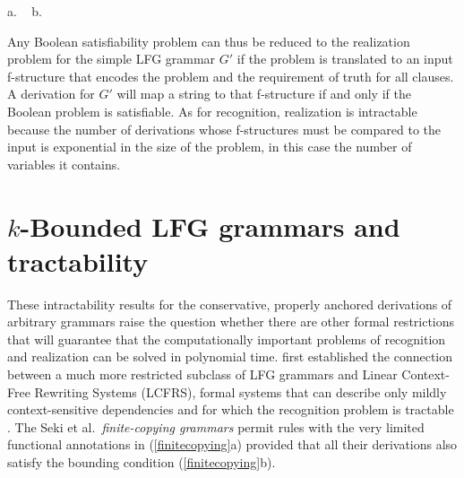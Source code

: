 \documentclass[output=paper,hidelinks]{langscibook}
\begin{document}
\ea\label{badfs}
\!\!\!a. \  
\hsp{1.5em}
b. \          
\z

 Any Boolean satisfiability problem can thus be reduced to the realization problem for the simple LFG grammar $G'$ if the problem is translated to an input f-structure that encodes the problem and the requirement of truth for all clauses.  A derivation for $G'$ will map a string to that f-structure if and only if the Boolean problem is satisfiable.  As for recognition, realization is intractable because the number of derivations whose f-structures must be compared to the input is exponential in the size of the problem, in this case the number of variables it contains.



\section{$k$-Bounded LFG grammars and tractability }\label{Tractable}

These intractability results for the conservative, properly anchored derivations of arbitrary grammars raise the question whether there are other formal restrictions that will guarantee that the computationally important problems of recognition and realization can be solved in polynomial time. \cite{SekiEtAl1993} first established the connection between a much more restricted subclass of LFG grammars and Linear Context-Free Rewriting Systems (LCFRS), formal systems that can describe only mildly context-sensitive dependencies and for which the recognition problem is tractable \citep{Kallmeyer2010b}.   The Seki et al.\ \emph{finite-copying grammars} permit rules with the very limited functional annotations in (\ref{finitecopying}a) provided that all their derivations also satisfy the bounding condition (\ref{finitecopying}b).
\end{document}
